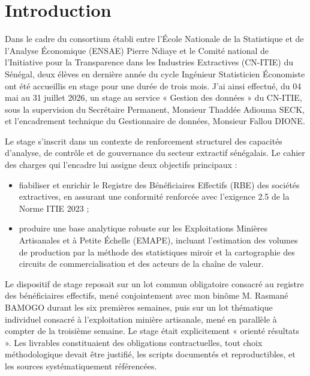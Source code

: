 \documentclass[12pt, a4paper]{article}
\begin{document}
\clearpage

\begin{singlespace}
\tableofcontents
\end{singlespace}
\clearpage

\pagestyle{fancy}
\setcounter{page}{1}

\section{Introduction}

Dans le cadre du consortium établi entre l'École Nationale de la Statistique et
de l'Analyse Économique (ENSAE) Pierre Ndiaye et le Comité national de
l'Initiative pour la Transparence dans les Industries Extractives (CN-ITIE) du
Sénégal, deux élèves en dernière année du cycle Ingénieur Statisticien
Économiste ont été accueillis en stage pour une durée de trois mois.
J'ai ainsi effectué, du 04 mai au 31 juillet 2026, un stage au service
« Gestion des données » du CN-ITIE, sous la supervision du Secrétaire Permanent,
Monsieur Thaddée Adiouma SECK, et l'encadrement technique du Gestionnaire de
données, Monsieur Fallou DIONE.

Le stage s'inscrit dans un contexte de renforcement structurel des capacités
d'analyse, de contrôle et de gouvernance du secteur extractif sénégalais. Le
cahier des charges qui l'encadre lui assigne deux objectifs principaux :

\begin{itemize}
  \item fiabiliser et enrichir le Registre des Bénéficiaires Effectifs
  (RBE) des sociétés extractives, en assurant une conformité renforcée avec
  l'exigence 2.5 de la Norme ITIE 2023 ;
  \item produire une base analytique robuste sur les Exploitations
  Minières Artisanales et à Petite Échelle (EMAPE), incluant l'estimation des
  volumes de production par la méthode des statistiques miroir et la
  cartographie des circuits de commercialisation et des acteurs de la chaîne de
  valeur.
\end{itemize}

Le dispositif de stage reposait sur un lot commun obligatoire consacré au
registre des bénéficiaires effectifs, mené conjointement avec mon binôme
M. Rasmané BAMOGO durant les six premières semaines, puis sur un lot
thématique individuel consacré à l'exploitation minière artisanale, mené en
parallèle à compter de la troisième semaine. Le stage était explicitement « orienté
résultats ». Les livrables constituaient des obligations contractuelles, tout
choix méthodologique devait être justifié, les scripts documentés et
reproductibles, et les sources systématiquement référencées.
\end{document}
